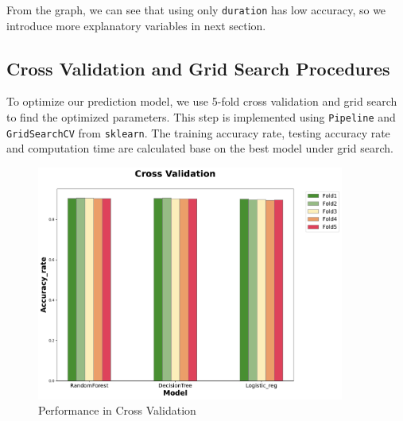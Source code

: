 \documentclass[11pt,a4paper]{article}
\begin{document}
    \noindent
    From the graph, we can see that using only \texttt{duration} has low accuracy, so we introduce more explanatory variables in next section.
    
    
    
    \subsection{Cross Validation and Grid Search Procedures}
    To optimize our prediction model, we use 5-fold cross validation and grid search to find the optimized parameters. This step is implemented using \texttt{Pipeline} and \texttt{GridSearchCV} from \texttt{sklearn}. The training accuracy rate, testing accuracy rate and computation time are calculated base on the best model under grid search. \\
    
    
    \begin{figure}[!ht]
        \centering
        \includegraphics[width = 0.9\textwidth]{plot/classification/cv.pdf}
        \caption{Performance in Cross Validation}
        \label{fig:cv}
    \end{figure}
    
    


\end{document}
